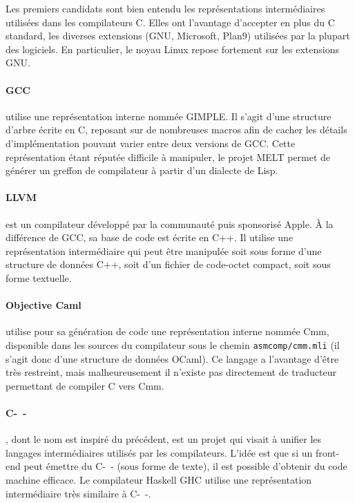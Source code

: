 
Les premiers candidats sont bien entendu les représentations intermédiaires
utilisées dans les compilateurs C. Elles ont l'avantage d'accepter en plus du C
standard, les diverses extensions (GNU, Microsoft, Plan9) utilisées par la
plupart des logiciels. En particulier, le noyau Linux repose fortement sur les
extensions GNU.

\paragraph{GCC} utilise une représentation interne nommée
GIMPLE\cite{gcc-gimple}. Il s'agit d'une structure d'arbre écrite en C, reposant
sur de nombreuses macros afin de cacher les détails d'implémentation pouvant
varier entre deux versions de GCC. Cette représentation étant réputée difficile
à manipuler, le projet MELT\cite{gcc-melt} permet de générer un greffon de
compilateur à partir d'un dialecte de Lisp.

\paragraph{LLVM}\cite{llvm-pres} est un compilateur développé par la communauté
puis sponsorisé Apple. À la différence de GCC, sa base de code est écrite en
C++. Il utilise une représentation intermédiaire qui peut être manipulée soit
sous forme d'une structure de données C++, soit d'un fichier de code-octet
compact, soit sous forme textuelle.

\paragraph{Objective Caml} utilise pour sa génération de code
une représentation interne nommée Cmm, disponible dans les sources du
compilateur sous le chemin \texttt{asmcomp/cmm.mli} (il s'agit donc d'une
structure de données OCaml). Ce langage a l'avantage d'être très restreint, mais
malheureusement il n'existe pas directement de traducteur permettant de compiler
C vers Cmm.

\paragraph{C-~-}\cite{spjcmm} , dont le nom est inspiré du précédent,
est un projet qui visait à unifier les langages intermédiaires utilisés par les
compilateurs. L'idée est que si un front-end peut émettre du C-~- (sous forme de
texte), il est possible d'obtenir du code machine efficace. Le compilateur
Haskell GHC utilise une représentation intermédiaire très similaire à C-~-.

